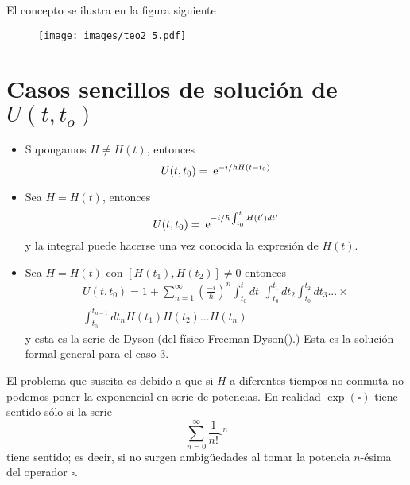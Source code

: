 \documentclass[10pt,oneside]{CBFT_book}
\begin{document}
El concepto se ilustra en la figura siguiente
\begin{figure}[htb]
	\begin{center}
	\texttt{[image: images/teo2\_5.pdf]}	 
	\end{center}
	\caption{}
\end{figure} 


\section{Casos sencillos de solución de $U(t,t_o)$}

\begin{itemize}
 \item Supongamos $ H \neq H(t)$, entonces
 \[
	U( t, t_0) = \:\mathrm{e}^{-i/\hbar H (t-t_0)} 
 \]
 \item Sea $ H = H(t)$, entonces
 \[
	U( t, t_0) = \:\mathrm{e}^{-i/\hbar \int_{t_0}^t H(t')dt'} 
 \]
 y la integral puede hacerse una vez conocida la expresión de $H(t)$.
 \item Sea $ H = H(t)$ con $[H(t_1),H(t_2)] \neq 0$ entonces
 \begin{multline*}
	U( t, t_0) =  1 + \sum_{n=1}^{\infty} \left( \frac{-i}{\hbar}\right)^n 
		\int_{t_0}^t dt_1 \int_{t_0}^{t_1} dt_2 \int_{t_0}^{t_2} dt_3 ... \times \\
			\int_{t_0}^{t_{n-1}} dt_n H(t_1) H(t_2) ... H(t_n)    
 \end{multline*}
y esta es la serie de Dyson (del físico Freeman Dyson().)
Esta es la solución formal general para el caso 3. 
\end{itemize}

El problema que suscita es debido a que si $H$ a diferentes tiempos no conmuta
no podemos poner la exponencial en serie de potencias. 
En realidad $\exp({\square})$ tiene sentido sólo si la serie 
\[
	\sum_{n=0}^{\infty}  \frac{1}{n!}\square^n
\]
tiene sentido; es decir, si no surgen ambigüedades al tomar la potencia $n$-ésima
del operador $\square$.
\end{document}
